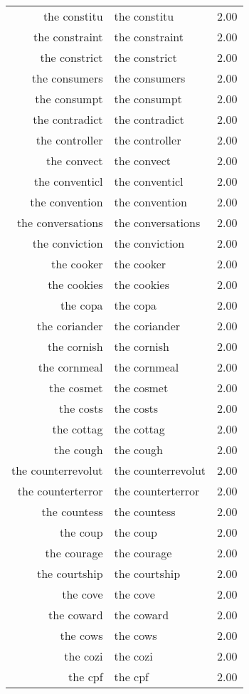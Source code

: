 \begin{table}[ht]
\begin{tabular}{rlr}
  the constitu & the constitu & 2.00 \\ 
  the constraint & the constraint & 2.00 \\ 
  the constrict & the constrict & 2.00 \\ 
  the consumers & the consumers & 2.00 \\ 
  the consumpt & the consumpt & 2.00 \\ 
  the contradict & the contradict & 2.00 \\ 
  the controller & the controller & 2.00 \\ 
  the convect & the convect & 2.00 \\ 
  the conventicl & the conventicl & 2.00 \\ 
  the convention & the convention & 2.00 \\ 
  the conversations & the conversations & 2.00 \\ 
  the conviction & the conviction & 2.00 \\ 
  the cooker & the cooker & 2.00 \\ 
  the cookies & the cookies & 2.00 \\ 
  the copa & the copa & 2.00 \\ 
  the coriander & the coriander & 2.00 \\ 
  the cornish & the cornish & 2.00 \\ 
  the cornmeal & the cornmeal & 2.00 \\ 
  the cosmet & the cosmet & 2.00 \\ 
  the costs & the costs & 2.00 \\ 
  the cottag & the cottag & 2.00 \\ 
  the cough & the cough & 2.00 \\ 
  the counterrevolut & the counterrevolut & 2.00 \\ 
  the counterterror & the counterterror & 2.00 \\ 
  the countess & the countess & 2.00 \\ 
  the coup & the coup & 2.00 \\ 
  the courage & the courage & 2.00 \\ 
  the courtship & the courtship & 2.00 \\ 
  the cove & the cove & 2.00 \\ 
  the coward & the coward & 2.00 \\ 
  the cows & the cows & 2.00 \\ 
  the cozi & the cozi & 2.00 \\ 
  the cpf & the cpf & 2.00 \\ 

\end{tabular}
\end{table}
